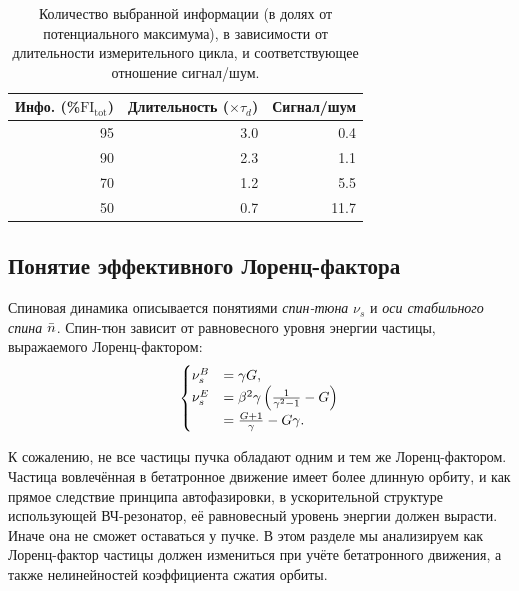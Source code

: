 \begin{table}[h]
	\caption{Количество выбранной информации (в долях от потенциального максимума), в зависимости от длительности измерительного цикла, и соответствующее отношение сигнал/шум.\label{tbl:FItot}}
	
	\centering
	\begin{tabular}{rrr}
		\toprule
		Инфо. (\%$\mathrm{FI_{tot}}$) & Длительность ($\times\tau_d$) & Сигнал/шум  \\
		\midrule
		95            & 3.0                     & 0.4         \\
		90            & 2.3                     & 1.1         \\
		70            & 1.2                     & 5.5         \\
		50            & 0.7                     & 11.7        \\
		\bottomrule
	\end{tabular}
\end{table}


\subsection{Понятие эффективного Лоренц-фактора}\label{chpt1:FS-methods:effective-Lorentz-factor}
Спиновая динамика описывается понятиями \emph{спин-тюна} $\nu_s$ и \emph{оси стабильного спина} $\bar n$.
Спин-тюн зависит от равновесного уровня энергии частицы, выражаемого Лоренц-фактором:
\begin{equation}\label{eq:spin_tune_vs_gamma}
\begin{cases}
\nu_s^B &= \gamma G, \\
\nu_s^E &= \beta^2\gamma\bkt{\frac{1}{\gamma^2-1} - G} \\
&= \frac{G+1}{\gamma} - G\gamma.
\end{cases}
\end{equation}

К сожалению, не все частицы пучка обладают одним и тем же Лоренц-фактором. Частица вовлечённая в 
бетатронное движение имеет более длинную орбиту, и как прямое следствие принципа автофазировки,
в ускорительной структуре использующей ВЧ-резонатор, её равновесный уровень энергии 
должен вырасти. Иначе она не сможет оставаться у пучке. В этом разделе мы анализируем как Лоренц-фактор частицы
должен измениться при учёте бетатронного движения, а также нелинейностей коэффициента сжатия орбиты.

